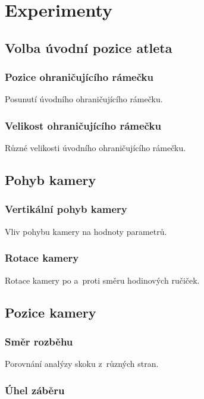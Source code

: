 \chapter{Experimenty}

\section{Volba úvodní pozice atleta}

\subsection{Pozice ohraničujícího rámečku}

Posunutí úvodního ohraničujícího rámečku.

\subsection{Velikost ohraničujícího rámečku}

Různé velikosti úvodního ohraničujícího rámečku.

\section{Pohyb kamery}

\subsection{Vertikální pohyb kamery}

Vliv pohybu kamery na hodnoty parametrů.

\subsection{Rotace kamery}

Rotace kamery po a~proti směru hodinových ručiček.

\section{Pozice kamery}

\subsection{Směr rozběhu}

Porovnání analýzy skoku z~různých stran.

\subsection{Úhel záběru}

